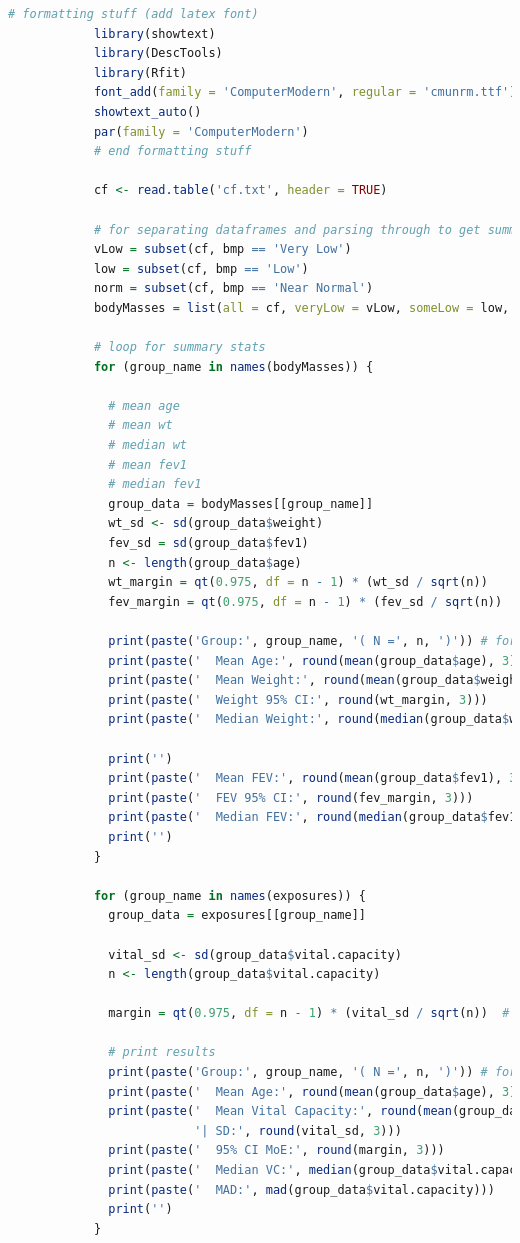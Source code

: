 \documentclass{article}
\begin{document}
		\begin{lstlisting}[language=R, basicstyle=\tiny]
			# formatting stuff (add latex font)
			library(showtext)
			library(DescTools)
			library(Rfit)
			font_add(family = 'ComputerModern', regular = 'cmunrm.ttf') # for consistent formatting in LaTex
			showtext_auto()
			par(family = 'ComputerModern')
			# end formatting stuff
			
			cf <- read.table('cf.txt', header = TRUE)
			
			# for separating dataframes and parsing through to get summaries
			vLow = subset(cf, bmp == 'Very Low')
			low = subset(cf, bmp == 'Low')
			norm = subset(cf, bmp == 'Near Normal')
			bodyMasses = list(all = cf, veryLow = vLow, someLow = low, nearNorm = norm)
			
			# loop for summary stats
			for (group_name in names(bodyMasses)) {
			
			  # mean age
			  # mean wt
			  # median wt
			  # mean fev1
			  # median fev1
			  group_data = bodyMasses[[group_name]]
			  wt_sd <- sd(group_data$weight)
			  fev_sd = sd(group_data$fev1)
			  n <- length(group_data$age)
			  wt_margin = qt(0.975, df = n - 1) * (wt_sd / sqrt(n))
			  fev_margin = qt(0.975, df = n - 1) * (fev_sd / sqrt(n))
			
			  print(paste('Group:', group_name, '( N =', n, ')')) # for future reference: paste() used to concatenate strings
			  print(paste('  Mean Age:', round(mean(group_data$age), 3))) # prints mean age
			  print(paste('  Mean Weight:', round(mean(group_data$weight), 3)))
			  print(paste('  Weight 95% CI:', round(wt_margin, 3)))
			  print(paste('  Median Weight:', round(median(group_data$weight), 3)))
			
			  print('')
			  print(paste('  Mean FEV:', round(mean(group_data$fev1), 3)))
			  print(paste('  FEV 95% CI:', round(fev_margin, 3)))
			  print(paste('  Median FEV:', round(median(group_data$fev1), 3)))
			  print('')
			}
			
			for (group_name in names(exposures)) {
			  group_data = exposures[[group_name]]
			
			  vital_sd <- sd(group_data$vital.capacity)
			  n <- length(group_data$vital.capacity)
			
			  margin = qt(0.975, df = n - 1) * (vital_sd / sqrt(n))  # margin for 95% CI
			
			  # print results
			  print(paste('Group:', group_name, '( N =', n, ')')) # for future reference: paste() used to concatenate strings
			  print(paste('  Mean Age:', round(mean(group_data$age), 3))) # prints mean age
			  print(paste('  Mean Vital Capacity:', round(mean(group_data$vital.capacity), 3),
						  '| SD:', round(vital_sd, 3)))
			  print(paste('  95% CI MoE:', round(margin, 3)))
			  print(paste('  Median VC:', median(group_data$vital.capacity)))
			  print(paste('  MAD:', mad(group_data$vital.capacity)))
			  print('')
			}
			

\end{lstlisting}
\end{document}
